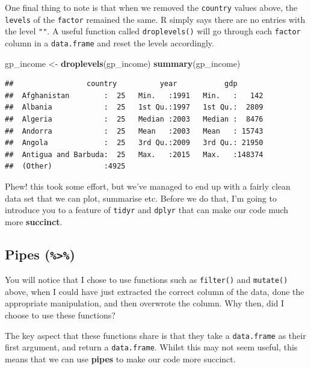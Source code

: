 \documentclass[]{book}
\newenvironment{Shaded}{\begin{snugshade}}{\end{snugshade}}
\newcommand{\KeywordTok}[1]{\textcolor[rgb]{0.13,0.29,0.53}{\textbf{{#1}}}}
\newcommand{\StringTok}[1]{\textcolor[rgb]{0.31,0.60,0.02}{{#1}}}
\newcommand{\NormalTok}[1]{{#1}}
\theoremstyle{definition}
\theoremstyle{definition}
\theoremstyle{definition}
\theoremstyle{remark}
\begin{document}
One final thing to note is that when we removed the \texttt{country}
values above, the \texttt{levels} of the \texttt{factor} remained the
same. R simply says there are no entries with the level \texttt{""}. A
useful function called \texttt{droplevels()} will go through each
\texttt{factor} column in a \texttt{data.frame} and reset the levels
accordingly.

\begin{Shaded}
\begin{Highlighting}[]
\NormalTok{gp_income <-}\StringTok{ }\KeywordTok{droplevels}\NormalTok{(gp_income)}
\KeywordTok{summary}\NormalTok{(gp_income)}
\end{Highlighting}
\end{Shaded}

\begin{verbatim}
##                 country          year           gdp        
##  Afghanistan        :  25   Min.   :1991   Min.   :   142  
##  Albania            :  25   1st Qu.:1997   1st Qu.:  2809  
##  Algeria            :  25   Median :2003   Median :  8476  
##  Andorra            :  25   Mean   :2003   Mean   : 15743  
##  Angola             :  25   3rd Qu.:2009   3rd Qu.: 21950  
##  Antigua and Barbuda:  25   Max.   :2015   Max.   :148374  
##  (Other)            :4925
\end{verbatim}

Phew! this took some effort, but we've managed to end up with a fairly
clean data set that we can plot, summarise etc. Before we do that, I'm
going to introduce you to a feature of \texttt{tidyr} and \texttt{dplyr}
that can make our code much more \textbf{succinct}.

\subsection{\texorpdfstring{Pipes
(\texttt{\%\textgreater{}\%})}{Pipes (\%\textgreater{}\%)}}\label{pipes}

You will notice that I chose to use functions such as \texttt{filter()}
and \texttt{mutate()} above, when I could have just extracted the
correct column of the data, done the appropriate manipulation, and then
overwrote the column. Why then, did I choose to use these functions?

The key aspect that these functions share is that they take a
\texttt{data.frame} as their first argument, and return a
\texttt{data.frame}. Whilst this may not seem useful, this means that we
can use \textbf{pipes} to make our code more succinct.
\end{document}
